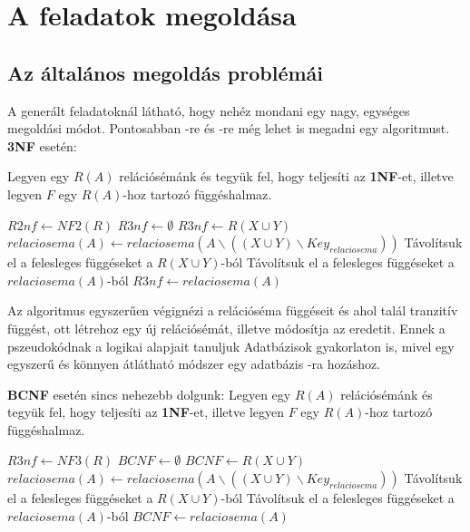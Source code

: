 \chapter{A feladatok megoldása \cite{normalcikk}}

\section{Az általános megoldás problémái}

A generált feladatoknál látható, hogy nehéz mondani egy nagy, egységes megoldási módot. Pontosabban \nfh-re és \BCNF-re még lehet is megadni egy algoritmust. \textbf{3NF} esetén: \par
Legyen egy $R(A)$ relációsémánk és tegyük fel, hogy teljesíti az \textbf{1NF}-et, illetve legyen $F$ egy $R(A)$-hoz tartozó függéshalmaz.
\hfill \break
\begin{algorithmic}
        \State $R2nf \gets NF2(R)$
        \State $R3nf \gets \emptyset$
                    \State $R3nf \gets R(X\cup Y)$
                    \State $relaciosema(A) \gets relaciosema(A \backslash ((X\cup Y) \backslash Key_{relaciosema}))$ 
                    \State Távolítsuk el a felesleges függéseket a $R(X \cup Y)$-ból
                \EndIf
            \EndFor
            \State Távolítsuk el a felesleges függéseket a $relaciosema(A)$-ból
            \State $R3nf \gets relaciosema(A)$
        \EndFor
    \EndFunction
\end{algorithmic}
\hfill \break
Az algoritmus egyszerűen végignézi a relációséma függéseit és ahol talál tranzitív függést, ott létrehoz egy új relációsémát, illetve módosítja az eredetit. Ennek a pszeudokódnak a logikai alapjait tanuljuk Adatbázisok gyakorlaton is, mivel egy egyszerű és könnyen átlátható módszer egy adatbázis \nfh-ra hozáshoz. \par
\textbf{BCNF} esetén sincs nehezebb dolgunk:
Legyen egy $R(A)$ relációsémánk és tegyük fel, hogy teljesíti az \textbf{1NF}-et, illetve legyen $F$ egy $R(A)$-hoz tartozó függéshalmaz.
\hfill \break
\begin{algorithmic}
        \State $R3nf \gets NF3(R)$
        \State $BCNF \gets \emptyset$
                    \State $BCNF \gets R(X\cup Y)$
                    \State $relaciosema(A) \gets relaciosema(A \backslash ((X\cup Y) \backslash Key_{relaciosema}))$ 
                    \State Távolítsuk el a felesleges függéseket a $R(X \cup Y)$-ból
                \EndIf
            \EndFor
            \State Távolítsuk el a felesleges függéseket a $relaciosema(A)$-ból
            \State $BCNF \gets relaciosema(A)$
        \EndFor
    \EndFunction
\end{algorithmic}
